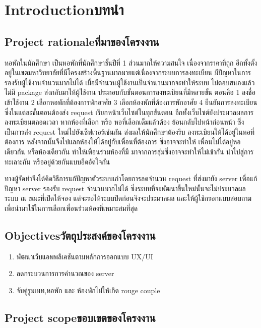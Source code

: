 \chapter{\ifenglish Introduction\else บทนำ\fi}

\section{\ifenglish Project rationale\else ที่มาของโครงงาน\fi}

หอพักในนักศึกษา เป็นหอพักที่นักศึกษาชั้นปีที่ 1 ส่วนมากให้ความสนใจ เนื่องจากราคาที่ถูก 
อีกทั้งตั้งอยู่ในเขตมหาวิทยาลัยที่มีโครงสร้างพื้นฐานมากมายแต่เนื่องจากระบบการลงทะเบียน
มีปัญหาในการรองรับผู้ใช้งานจำนวนมากไม่ได้ เมื่อมีจำนวนผู้ใช้งานเป็นจำนวนมากจะทำให้ระบบ
ไม่ตอบสนองแล้วไม่มี package ส่งกลับมาให้ผู้ใช้งาน ประกอบกับขั้นตอนการลงทะเบียนที่มีหลายขั้น
ตอนคือ 1 ลงชื่อเข้าใช้งาน 2 เลือกหอพักที่ต้องการพักอาศัย 3 เลือกห้องพักที่ต้องการพักอาศัย 
4 ยืนยันการลงทะเบียน ซึ่งในแต่ละขั้นตอนต้องส่ง request เรียกหน้าเว็บไซต์ในทุกขั้นตอน 
อีกทั้งเว็บไซต์ยังประมวลผลการลงทะเบียนตลอดเวลา หากห้องที่เลือก หรือ หอที่เลือกเต็มแล้วต้อง
ย้อนกลับไปหน้าก่อนหน้า ซึ่งเป็นการส่ง request ใหม่ไปยังเซิฟเวอร์เช่นกัน ส่งผลให้นักศึกษาต้องรีบ
ลงทะเบียนให้ได้อยู่ในหอที่ต้องการ หลังจากนั้นจึงไปแลกห้องให้ได้อยู่กับเพื่อนที่ต้องการ ซึ่งอาจจะทำให้
เพื่อนไม่ได้อยู่หอเดียวกัน หรือห้องเดียวกัน ทำให้เพื่อนร่วมห้องที่มี มาจากการสุ่มซึ่งอาจจะทำให้ไม่เข้ากัน
นำไปสู่การทะเลาะกัน หรืออยู่ด้วยกันแบบอึดอัดใจกัน

ทางผู้จัดทำจึงได้คิดวิธีการแก้ปัญหาตัวระบบเก่าโดยการลดจำนวน request ที่ส่งมายัง server เพื่อแก้ปัญหา 
server รองรับ request จำนวนมากไม่ได้ ซึ่งระบบที่จะพัฒนาขึ้นใหม่นั้นจะไม่ประมวลผลระบบ ณ ขณะที่เปิดให้จอง
แต่จะรอให้ระบบปิดก่อนจึงจะประมวลผล และให้ผู้ใช้กรอกแบบสอบถามเพื่อนำมาใช้ในการเลือกเพื่อนร่วมห้องที่เหมาะสมที่สุด

\section{\ifenglish Objectives\else วัตถุประสงค์ของโครงงาน\fi}
\begin{enumerate}
    \item พัฒนาเว็บแอพพลิเคชันตามหลักการออกแบบ UX/UI
    \item ลดกระบวนการการคำนวณของ server
    \item จับคู่รูมเมท,หอพัก และ ห้องพักไม่ให้เกิด rouge couple
\end{enumerate}

\section{\ifenglish Project scope\else ขอบเขตของโครงงาน\fi}
